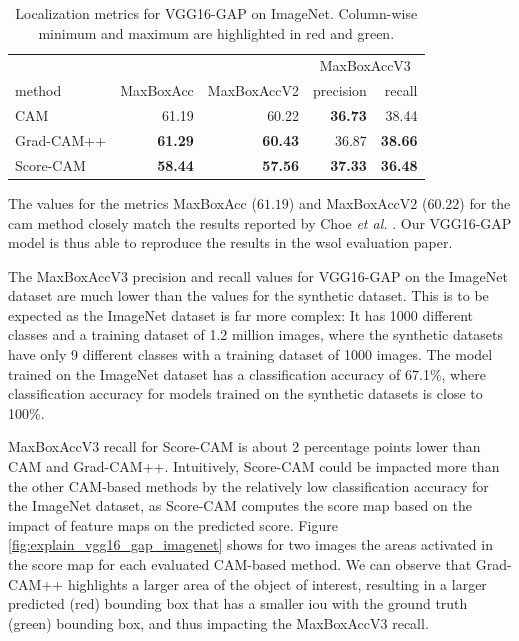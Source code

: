 \begin{table}[h]
\centering
\begin{tabular}{lrrrr}
\toprule
 & & & \multicolumn{2}{c}{MaxBoxAccV3} \\
method & MaxBoxAcc & MaxBoxAccV2 & precision & recall \\
\cmidrule(lr){1-1} \cmidrule(lr){2-5}
CAM & 61.19 & 60.22 & \color{purple} \bfseries 36.73 & 38.44 \\
Grad-CAM++ & \color{teal} \bfseries 61.29 & \color{teal} \bfseries 60.43 & 36.87 & \color{teal} \bfseries 38.66 \\
Score-CAM & \color{purple} \bfseries 58.44 & \color{purple} \bfseries 57.56 & \color{teal} \bfseries 37.33 & \color{purple} \bfseries 36.48 \\
\bottomrule
\end{tabular}
\caption[Localization metrics for VGG16-GAP on ImageNet]{Localization metrics for VGG16-GAP on ImageNet. Column-wise minimum and maximum are highlighted in red and green.}
\label{tab:metrics_vgg16_gap_imagenet}
\end{table}

The values for the metrics MaxBoxAcc ($61.19$) and MaxBoxAccV2 ($60.22$) for the \acrshort{cam} method closely match the results reported by Choe \textit{et al.} \cite{choe2020evaluating}. Our VGG16-GAP model is thus able to reproduce the results in the \acrshort{wsol} evaluation paper.

The MaxBoxAccV3 precision and recall values for VGG16-GAP on the ImageNet dataset are much lower than the values for the synthetic dataset. This is to be expected as the ImageNet dataset is far more complex: It has 1000 different classes and a training dataset of 1.2 million images, where the synthetic datasets have only 9 different classes with a training dataset of 1000 images. The model trained on the ImageNet dataset has a classification accuracy of 67.1\%, where classification accuracy for models trained on the synthetic datasets is close to 100\%. 

MaxBoxAccV3 recall for Score-CAM is about 2 percentage points lower than CAM and Grad-CAM++. Intuitively, Score-CAM could be impacted more than the other CAM-based methods by the relatively low classification accuracy for the ImageNet dataset, as Score-CAM computes the score map based on the impact of feature maps on the predicted score. Figure \ref{fig:explain_vgg16_gap_imagenet} shows for two images the areas activated in the score map for each evaluated CAM-based method. We can observe that Grad-CAM++ highlights a larger area of the object of interest, resulting in a larger predicted (red) bounding box that has a smaller \acrshort{iou} with the ground truth (green) bounding box, and thus impacting the MaxBoxAccV3 recall. 

